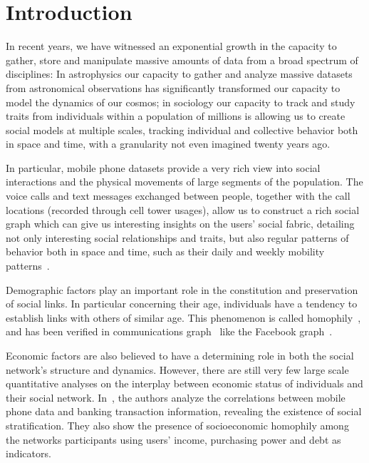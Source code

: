 \section{Introduction}

In recent years, we have witnessed an exponential growth in the capacity to gather, store and manipulate massive amounts of data from a broad spectrum of disciplines: In astrophysics our capacity to gather and analyze massive datasets from astronomical observations has significantly transformed our capacity to model the dynamics of our cosmos; in sociology our capacity to track and study traits from individuals within a population of millions is allowing us to create social models at multiple scales, tracking individual and collective behavior both in space and time, with a granularity not even imagined twenty years ago.

In particular, mobile phone datasets provide a very rich view into social interactions and the physical movements of large segments of the population. The voice calls and text messages exchanged between people, together with the call locations (recorded through cell tower usages), allow us to construct a rich social graph which can give us interesting insights on the users' social fabric, detailing not only interesting social relationships and traits, but also regular patterns of behavior both in space and time, such as their daily and weekly mobility patterns~\cite{gonzalez2008understanding,ponieman2013human,sarraute2015city}.

Demographic factors play an important role in the constitution and preservation of social links. In particular concerning their age, individuals have a tendency to
establish links with others of similar age. This phenomenon is called homophily~\cite{mcpherson2001birds}, and has been verified in communications graph~\cite{blumenstock2010mobile,sarraute2014} like the Facebook graph~\cite{ugander2011anatomy}.

Economic factors are also believed to have a determining role in both the social network's structure and dynamics. However, there are still very few large scale quantitative analyses on the interplay between economic status of individuals and their social network. In~\cite{leo2015socioeconomic}, the authors analyze the correlations between mobile phone data and banking transaction information, revealing the existence of social stratification. They also show the presence of socioeconomic homophily among the networks participants using users' income, purchasing power and debt as indicators.


